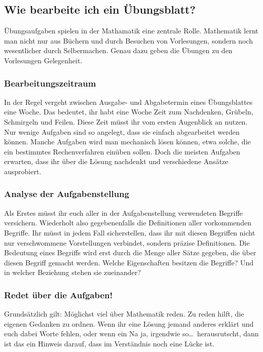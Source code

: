 \subsection{Wie bearbeite ich ein Übungsblatt?}

Übungsaufgaben spielen in der Mathamatik eine zentrale Rolle. Mathematik lernt
man nicht nur aus Büchern und durch Besuchen von Vorlesungen, sondern noch
wesentlicher durch Selbermachen. Genau dazu geben die Übungen zu den
Vorlesungen Gelegenheit.

\subsubsection{Bearbeitungszeitraum}

In der Regel vergeht zwischen Ausgabe- und Abgabetermin eines Übungsblattes
eine Woche. Das bedeutet, ihr habt eine Woche Zeit zum Nachdenken, Grübeln,
Schmirgeln und Feilen. Diese Zeit müsst ihr vom ersten Augenblick an nutzen.
Nur wenige Aufgaben sind so angelegt, dass sie einfach abgearbeitet werden
können. Manche Aufgaben wird man mechanisch lösen können, etwa solche, die ein
bestimmtes Rechenverfahren einüben sollen. Doch die meisten Aufgaben erwarten,
dass ihr über die Lösung nachdenkt und verschiedene Ansätze ausprobiert.

\subsubsection{Analyse der Aufgabenstellung}

Als Erstes müsst ihr euch aller in der Aufgabenstellung verwendeten Begriffe
versichern. Wiederholt also gegebenenfalls die Definitionen aller vorkommenden
Begriffe. Ihr müsst in jedem Fall sicherstellen, dass ihr mit diesen Begriffen
nicht nur verschwommene Vorstellungen verbindet, sondern präzise Definitionen.
Die Bedeutung eines Begriffs wird erst durch die Menge aller Sätze gegeben, die
über diesen Begriff gemacht werden. Welche Eigenschaften besitzen die Begriffe?
Und in welcher Beziehung stehen sie zueinander?

\subsubsection{Redet über die Aufgaben!}

Grundsätzlich gilt: Möglichst viel über Mathematik reden. Zu reden hilft, die
eigenen Gedanken zu ordnen. Wenn ihr eine Lösung jemand anderes erklärt und
euch dabei Worte fehlen, oder wenn ein \glqq Na ja, irgendwie so\dots\grqq\
herausrutscht, dann ist das ein Hinweis darauf, dass im Verständnis noch eine
Lücke ist.

